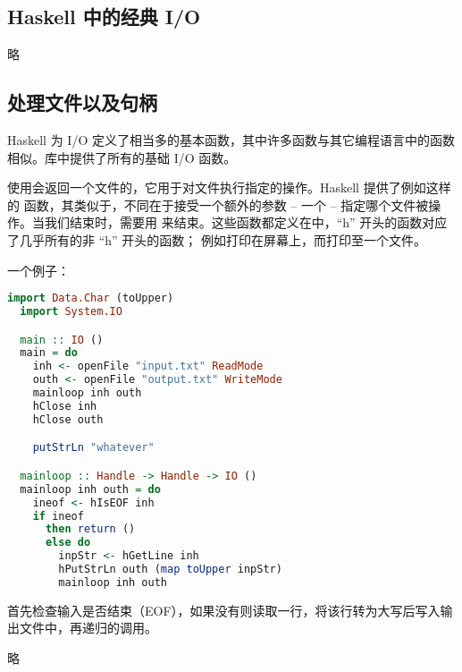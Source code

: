 \documentclass[./main.tex]{subfiles}
\begin{document}
\subsection*{Haskell 中的经典 I/O}

略

\subsection*{处理文件以及句柄}

Haskell 为 I/O 定义了相当多的基本函数，其中许多函数与其它编程语言中的函数相似。库中提供了所有的基础 I/O 函数。

使用会返回一个文件的，它用于对文件执行指定的操作。Haskell 提供了例如这样的
函数，其类似于，不同在于接受一个额外的参数 -- 一个 -- 指定哪个文件被操作。当我们结束时，需要用
来结束。这些函数都定义在中，“h” 开头的函数对应了几乎所有的非 “h” 开头的函数；
例如打印在屏幕上，而打印至一个文件。

一个例子：

\begin{lstlisting}[language=Haskell]
  import Data.Char (toUpper)
  import System.IO

  main :: IO ()
  main = do
    inh <- openFile "input.txt" ReadMode
    outh <- openFile "output.txt" WriteMode
    mainloop inh outh
    hClose inh
    hClose outh

    putStrLn "whatever"

  mainloop :: Handle -> Handle -> IO ()
  mainloop inh outh = do
    ineof <- hIsEOF inh
    if ineof
      then return ()
      else do
        inpStr <- hGetLine inh
        hPutStrLn outh (map toUpper inpStr)
        mainloop inh outh
\end{lstlisting}

首先检查输入是否结束（EOF），如果没有则读取一行，将该行转为大写后写入输出文件中，再递归的调用。

略
\end{document}
